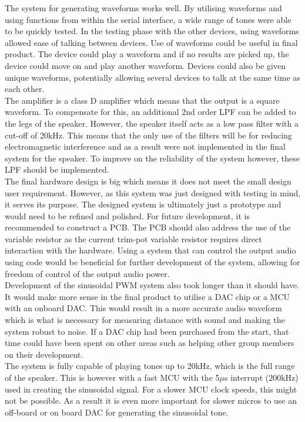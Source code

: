 \documentclass[12pt, a4paper]{article}
\begin{document}
The system for generating waveforms works well. By utilising waveforms and using functions from within the serial interface, a wide range of tones were able to be quickly tested. In the testing phase with the other devices, using waveforms allowed ease of talking between devices. Use of waveforms could be useful in final product. The device could play a waveform and if no results are picked up, the device could move on and play another waveform. Devices could also be given unique waveforms, potentially allowing several devices to talk at the same time as each other. \\

The amplifier is a class D amplifier which means that the output is a square waveform. To compensate for this, an additional 2nd order LPF can be added to the legs of the speaker. However, the speaker itself acts as a low pass filter with a cut-off of 20kHz. This means that the only use of the filters will be for reducing electromagnetic interference and as a result were not implemented in the final system for the speaker. To improve on the reliability of the system however, these LPF should be implemented. \\

The final hardware design is big which means it does not meet the small design user requirement. However, as this system was just designed with testing in mind, it serves its purpose. The designed system is ultimately just a prototype and would need to be refined and polished. For future development, it is recommended to construct a PCB. The PCB should also address the use of the variable resistor as the current trim-pot variable resistor requires direct interaction with the hardware. Using a system that can control the output audio using code would be beneficial for further development of the system, allowing for freedom of control of the output audio power. \\

Development of the sinusoidal PWM system also took longer than it should have. It would make more sense in the final product to utilise a DAC chip or a MCU with an onboard DAC. This would result in a more accurate audio waveform which is what is necessary for measuring distance with sound and making the system robust to noise. If a DAC chip had been purchased from the start, that time could have been spent on other areas such as helping other group members on their development. \\

The system is fully capable of playing tones up to 20kHz, which is the full range of the speaker. This is however with a fast MCU with the 5$\mu$s interrupt (200kHz) used in creating the sinusoidal signal. For a slower MCU clock speeds, this might not be possible. As a result it is even more important for slower micros to use an off-board or on board DAC for generating the sinusoidal tone.\\
\end{document}
